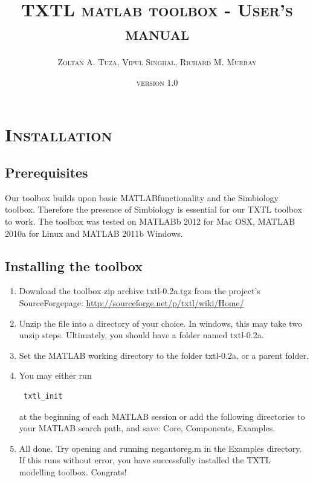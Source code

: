 \documentclass[english]{report}
\begin{document}
\title{\textsc{TXTL matlab toolbox - User's manual}}
\date{\textsc{version 1.0}}
\author{\textsc{Zoltan A. Tuza, Vipul Singhal, Richard M. Murray}}
\maketitle
\textsc{\tableofcontents}



\chapter{\textsc{Installation}}
	\section{Prerequisites}
	Our toolbox builds upon basic MATLAB\texttrademark  functionality and the Simbiology toolbox. Therefore the presence of Simbiology is essential for our TXTL toolbox to work. The toolbox was tested on MATLABb 2012 for Mac OSX, MATLAB 2010a for Linux and MATLAB 2011b Windows. 
	\section{Installing the toolbox}
	\begin{enumerate}
\item Download the toolbox zip archive \textsf{txtl-0.2a.tgz} from the project's SourceForge\texttrademark page: \url{http://sourceforge.net/p/txtl/wiki/Home/}
\item Unzip the file into a directory of your choice. In windows, this may take two unzip steps. Ultimately, you should have a folder named txtl-0.2a. 
\item Set the MATLAB working directory to the folder txtl-0.2a, or a parent folder. 
\item You may either run \begin{verbatim} txtl_init  \end{verbatim} at the
beginning of each MATLAB session or add the following directories to
your MATLAB search path, and save: \textsf{Core, Components, Examples}. 
\item All done. Try opening and running \textsf{negautoreg.m} in the \textsf{Examples} directory. If this runs without error, you have successfully installed the TXTL modelling toolbox. Congrats!
\end{enumerate}
	
\end{document}
